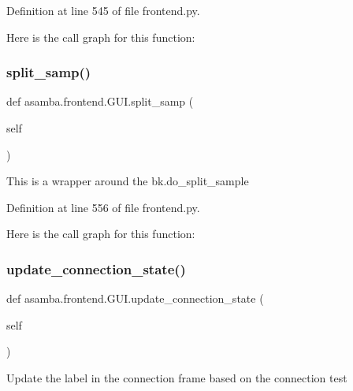 Definition at line 545 of file frontend.\+py.

Here is the call graph for this function\+:
\mbox{\label{classasamba_1_1frontend_1_1_g_u_i_a284b5146fbb37994b46e34ce48475f65}} 
\subsubsection{\texorpdfstring{split\+\_\+samp()}{split\_samp()}}
{\footnotesize\ttfamily def asamba.\+frontend.\+G\+U\+I.\+split\+\_\+samp (\begin{DoxyParamCaption}\item[{}]{self }\end{DoxyParamCaption})}

\begin{DoxyVerb}This is a wrapper around the bk.do_split_sample \end{DoxyVerb}
 

Definition at line 556 of file frontend.\+py.

Here is the call graph for this function\+:
\mbox{\label{classasamba_1_1frontend_1_1_g_u_i_a905cc040d83a85cd64003f98b859a64a}} 
\subsubsection{\texorpdfstring{update\+\_\+connection\+\_\+state()}{update\_connection\_state()}}
{\footnotesize\ttfamily def asamba.\+frontend.\+G\+U\+I.\+update\+\_\+connection\+\_\+state (\begin{DoxyParamCaption}\item[{}]{self }\end{DoxyParamCaption})}

\begin{DoxyVerb}Update the label in the connection frame based on the connection test \end{DoxyVerb}
 

